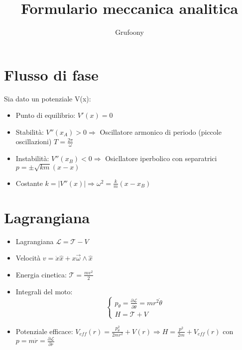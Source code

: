 \documentclass[a4paper]{article}
\begin{document}
	\title{Formulario meccanica analitica}
	\author{Grufoony}
    \maketitle
    \section{Flusso di fase}
        Sia dato un potenziale V(x):
        \begin{itemize}
            \item Punto di equilibrio: $V'(x)=0$
            \item Stabilità: $V''(x_A)>0 \Rightarrow$ Oscillatore armonico di periodo (piccole oscillazioni) $T=\frac{2\pi}{\omega}$
            \item Instabilità: $V''(x_B)<0 \Rightarrow$ Osicllatore iperbolico con separatrici $p=\pm\sqrt{km}(x-x)$
            \item Costante $k=\lvert V''(x) \rvert \Rightarrow \omega^2=\frac{k}{m}(x-x_B)$
        \end{itemize}
    \section{Lagrangiana}
        \begin{itemize}
            \item Lagrangiana $\mathcal{L}=\mathcal{T}-V$
            \item Velocità $v=\dot{x}\hat{x}+x\vec{\omega}\wedge\hat{x}$
            \item Energia cinetica: $\mathcal{T}=\frac{mv^2}{2}$
            \item Integrali del moto:
                \begin{equation}
                    \begin{cases}
                    p_\theta=\frac{\partial{\mathcal{L}}}{\partial{\dot{\theta}}}=mr^2\dot{\theta}\\
                    H=\mathcal{T}+V
                    \end{cases}
                \end{equation}
            \item Potenziale efficace: $V_{eff}(r)=\frac{p_\theta^2}{2mr^2}+V(r) \Rightarrow H=\frac{p^2}{2m}+V_{eff}(r)$ con $p=m\dot{r}=\frac{\partial{\mathcal{L}}}{\partial{\dot{r}}}$
        \end{itemize}
\end{document}
